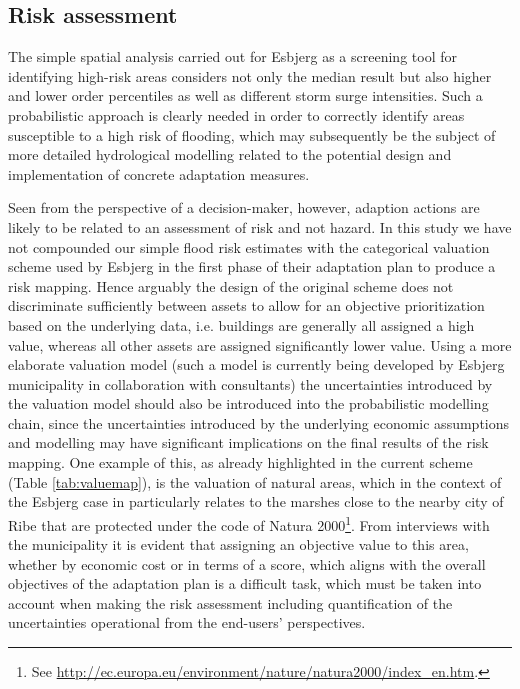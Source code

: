 \documentclass[note,screen,british,11pt]{nrdoc}
\begin{document}
\subsection{Risk assessment}
The simple spatial analysis carried out for Esbjerg as a screening tool for identifying high-risk areas considers not only the median result but also higher and lower order percentiles as well as different storm surge intensities. Such a probabilistic approach is clearly needed in order to correctly identify areas susceptible to a high risk of flooding, which may subsequently be the subject of more detailed hydrological modelling related to the potential design and implementation of concrete adaptation measures.

Seen from the perspective of a decision-maker, however, adaption actions are likely to be related to an assessment of risk and not hazard. In this study we have not compounded our simple flood risk estimates with the categorical valuation scheme used by Esbjerg in the first phase of their adaptation plan to produce a risk mapping. Hence arguably the design of the original scheme does not discriminate sufficiently between assets to allow for an objective prioritization based on the underlying data, i.e. buildings are generally all assigned a high value, whereas all other assets are assigned significantly lower value. Using a more elaborate valuation model (such a model is currently being developed by Esbjerg municipality in collaboration with consultants) the uncertainties introduced by the valuation model should also be introduced into the probabilistic modelling chain, since the uncertainties introduced by the underlying economic assumptions and modelling \citep{Halsnaes&2015} may have significant implications on the final results of the risk mapping. One example of this, as already highlighted in the current scheme (Table \ref{tab:valuemap}), is the valuation of natural areas, which in the context of the Esbjerg case in particularly relates to the marshes close to the nearby city of Ribe that are protected under the code of Natura 2000\footnote{See \url{http://ec.europa.eu/environment/nature/natura2000/index_en.htm}.}. From interviews with the municipality it is evident that assigning an objective value to this area, whether by economic cost or in terms of a score, which aligns with the overall objectives of the adaptation plan is a difficult task, which must be taken into account when making the risk assessment including quantification of the uncertainties operational from the end-users' perspectives. 
\end{document}
